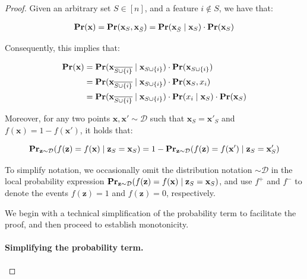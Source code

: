 \documentclass{article}
\newcommand{\z}{\textbf{z}}
\newcommand{\x}{\textbf{x}}
\newcommand{\fml}[1]{{\mathcal{#1}}}
\newcommand{\mbf}[1]{\ensuremath\mathbf{#1}}
\begin{document}
\begin{proof}
Given an arbitrary set $S\in [n]$, and a feature $i\not\in S$, we have that:

\begin{equation}
\begin{aligned}
\mbf{Pr}(\x) = \mbf{Pr}(\x_{S}, \x_{\bar{S}}) = \mbf{Pr}(\x_{\bar{S}} \mid \x_{S}) \cdot \mbf{Pr}(\x_{S})
\end{aligned}
\end{equation}


Consequently, this implies that:

\begin{equation}
\begin{aligned}
\mbf{Pr}(\x)
&= \mbf{Pr}(\x_{\overline{S\cup\{i\}}} \mid \x_{S\cup\{i\}}) \cdot \mbf{Pr}(\x_{S\cup\{i\}}) \\
&= \mbf{Pr}(\x_{\overline{S\cup\{i\}}} \mid \x_{S\cup\{i\}}) \cdot \mbf{Pr}(\x_{S},x_i) \\
&= \mbf{Pr}(\x_{\overline{S\cup\{i\}}} \mid \x_{S\cup\{i\}}) \cdot \mbf{Pr}(x_i \mid \x_{S}) \cdot \mbf{Pr}(\x_{S})
\end{aligned}
\end{equation}


Moreover, for any two points $\x, \x' \sim \mathcal{D}$ such that $\x_{S} = \x'_{S}$ and $f(\x) = 1 - f(\x')$, it holds that:


\begin{equation}
\mbf{Pr}_{\z\sim \mathcal{D}}(f(\z) = f(\x) \mid \z_{S} = \x_{S}) = 1 - \mbf{Pr}_{\z\sim \mathcal{D}}(f(\z) = f(\x') \mid \z_{S} = \x'_{S})
\end{equation}

To simplify notation, we occasionally omit the distribution notation $\sim \mathcal{D}$ in the local probability expression $\mbf{Pr}_{\z\sim \mathcal{D}}(f(\z) = f(\x) \mid \z_{S} = \x_{S})$, and use $f^{+}$ and $f^{-}$ to denote the events $f(\z) = 1$ and $f(\z) = 0$, respectively.

We begin with a technical simplification of the probability term to facilitate the proof, and then proceed to establish monotonicity.


\paragraph{Simplifying the probability term.}



\end{proof}
\end{document}
